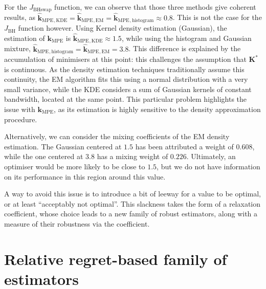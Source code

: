 \documentclass[preprint, 1p]{elsarticle}
\newcommand{\kmpe}{{\mathbf{k}}_{\mathrm{MPE}}}
\newcommand{\hatkmpe}{\hat{\mathbf{k}}_{\mathrm{MPE}}}
\newcommand{\elise}[1]{{\itshape\color{red} ({#1})}}
\begin{document}
For the $J_{\mathrm{BHswap}}$ function, we can observe that those three methods give coherent results, as $\hatkmpe {}_{,\mathrm{KDE}} =\hatkmpe {}_{,\mathrm{EM}}=\hatkmpe {}_{,\mathrm{histogram}}\approx 0.8$. This is not the case for the  $J_{\mathrm{BH}}$ function however. Using Kernel density estimation (Gaussian), the estimation of $\kmpe$ is $\hatkmpe {}_{,\mathrm{KDE}} \approx 1.5$, while using the histogram and Gaussian mixture, $\hatkmpe {}_{,\mathrm{histogram}}=\hatkmpe {}_{,\mathrm{EM}}=3.8$.
This difference is explained by the accumulation of minimisers at this point: this challenges the assumption that $\mathbf{K}^*$ is continuous. As the density estimation techniques traditionally assume this continuity, the EM algorithm fits this using a normal distribution with a very small variance, while the KDE considers a sum of Gaussian kernels of constant bandwidth, located at the same point. This particular problem highlights the issue with $\kmpe$, as its estimation is highly sensitive to the density approximation procedure.

Alternatively, we can consider the mixing coefficients of the EM density estimation. The Gaussian centered at $1.5$ has been attributed a weight of $0.608$, while the one centered at $3.8$ has a mixing weight of $0.226$. Ultimately, an optimiser would be more likely to be close to $1.5$, but we do not have information on its performance in this region around this value.

A way to avoid this issue is to introduce a bit of leeway for a value to be optimal, or at least ``acceptably not optimal''. This slackness takes the form of a relaxation coefficient, whose choice leads to a new family of robust estimators, along with a measure of their robustness via the coefficient.





\section{Relative regret-based family of estimators}%
\label{sec:relax_constraint}
\end{document}
